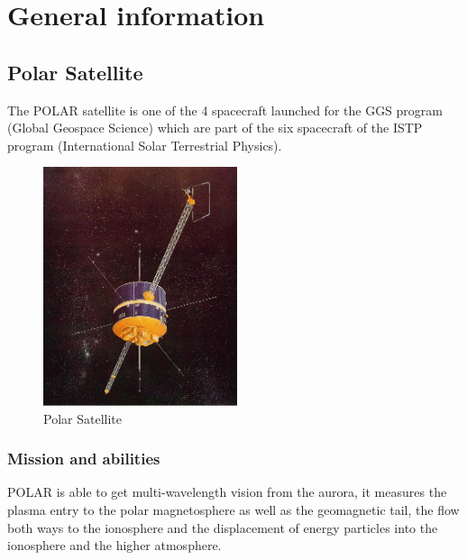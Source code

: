 \documentclass[a4paper,12pt,calibri,oneside,openany]{book}
\theoremstyle{break}
\begin{document}

\frontmatter



\tableofcontents

\mainmatter
\pagestyle{fancy}



\chapter{General information}
\section{Polar Satellite}
The POLAR satellite is one of the 4 spacecraft launched for the GGS program (Global Geospace Science) which are part of the six spacecraft of the ISTP program (International Solar Terrestrial Physics). \\
\begin{figure}[h]
	\centering
	\includegraphics[height=7cm]{polar}
	\caption{Polar Satellite }
\end{figure}
\subsection{Mission and abilities}
POLAR is able to get multi-wavelength vision from the aurora, it measures the plasma entry to the polar magnetosphere as well as the geomagnetic tail, the flow both ways to the ionosphere and the displacement of energy particles into the ionosphere and the higher atmosphere. \\
\end{document}
